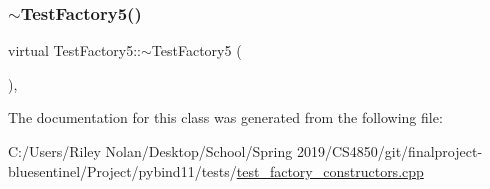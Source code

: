 \mbox{\label{class_test_factory5_ade5cfff7b295ef6eb7f9cafabc9c1ff7}} 
\subsubsection{\texorpdfstring{$\sim$TestFactory5()}{~TestFactory5()}}
{\footnotesize\ttfamily virtual Test\+Factory5\+::$\sim$\+Test\+Factory5 (\begin{DoxyParamCaption}{ }\end{DoxyParamCaption})\hspace{0.3cm}{\ttfamily [inline]}, {\ttfamily [virtual]}}



The documentation for this class was generated from the following file\+:\begin{DoxyCompactItemize}
\item 
C\+:/\+Users/\+Riley Nolan/\+Desktop/\+School/\+Spring 2019/\+C\+S4850/git/finalproject-\/bluesentinel/\+Project/pybind11/tests/\mbox{\hyperlink{test__factory__constructors_8cpp}{test\+\_\+factory\+\_\+constructors.\+cpp}}\end{DoxyCompactItemize}
